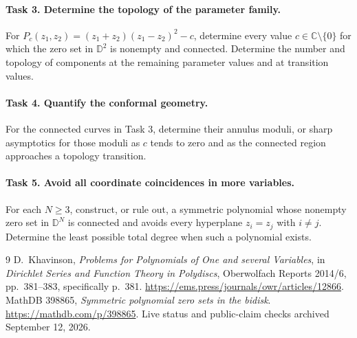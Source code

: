 \documentclass[11pt]{article}
\newcommand{\D}{\mathbb D}
\newcommand{\C}{\mathbb C}
\begin{document}
\paragraph{Task 3. Determine the topology of the parameter family.}
For $P_c(z_1,z_2)=(z_1+z_2)(z_1-z_2)^2-c$, determine every value
$c\in\C\setminus\{0\}$ for which the zero set in $\D^2$ is nonempty and
connected. Determine the number and topology of components at the
remaining parameter values and at transition values.

\paragraph{Task 4. Quantify the conformal geometry.}
For the connected curves in Task 3, determine their annulus moduli,
or sharp asymptotics for those moduli as $c$ tends to zero and as the
connected region approaches a topology transition.

\paragraph{Task 5. Avoid all coordinate coincidences in more variables.}
For each $N\ge3$, construct, or rule out, a symmetric polynomial whose
nonempty zero set in $\D^N$ is connected and avoids every hyperplane
$z_i=z_j$ with $i\ne j$. Determine the least possible total degree when
such a polynomial exists.

\begin{thebibliography}{9}
D.~Khavinson, \emph{Problems for Polynomials of One and several Variables},
in \emph{Dirichlet Series and Function Theory in Polydiscs},
Oberwolfach Reports 2014/6, pp.~381--383, specifically p.~381.
\url{https://ems.press/journals/owr/articles/12866}.
MathDB 398865, \emph{Symmetric polynomial zero sets in the bidisk}.
\url{https://mathdb.com/p/398865}. Live status and public-claim checks
archived September 12, 2026.
\end{thebibliography}
\end{document}
